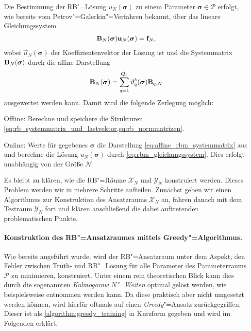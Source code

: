 \documentclass[../main.tex]{subfiles}
\begin{document}
Die Bestimmung der RB"=Lösung $u_{N}(\bm \sigma)$ zu einem Parameter $\bm \sigma \in \mathcal P$ erfolgt, wie bereits vom Petrov"=Galerkin"=Verfahren bekannt, über das lineare Gleichungssystem
\begin{equation}
\label{eq:rbm_gleichungssystem}
    \mathbf{B}_{N}(\bm \sigma) \mathbf{u}_{N}(\bm \sigma) = \mathbf{f}_{N},
\end{equation}
wobei $\vec{u}_{N}(\bm \sigma)$ der Koeffizientenvektor der Lösung ist und die Systemmatrix $\mathbf{B}_{N}(\bm \sigma)$ durch die affine Darstellung
\begin{equation}
\label{eq:affine_rbm_systemmatrix}
    \mathbf{B}_{N}(\bm \sigma) = \sum_{q = 1}^{Q_b} \vartheta_{q}^{b}(\bm \sigma) \mathbf{B}_{q, N}
\end{equation}
ausgewertet werden kann.
Damit wird die folgende Zerlegung möglich:
\begin{onoffdescription}
    \item[Offline:]
    Berechne und speichere die Strukturen \cref{eq:rb_systemmatrix_und_lastvektor,eq:rb_normmatrizen}.

    \item[Online:]
    Werte für gegebenes $\bm \sigma$ die Darstellung \cref{eq:affine_rbm_systemmatrix} aus und berechne die Lösung $u_{N}(\bm \sigma)$ durch \cref{eq:rbm_gleichungssystem}.
    Dies erfolgt unabhängig von der Größe $\mathcal N$.
\end{onoffdescription}

Es bleibt zu klären, wie die RB"=Räume $\mathcal X_{N}$ und $\mathcal Y_{N}$ konstruiert werden.
Dieses Problem werden wir in mehrere Schritte aufteilen.
Zunächst geben wir einen Algorithmus zur Konstruktion des Ansatzraums $\mathcal X_{N}$ an, fahren danach mit dem Testraum $\mathcal Y_{N}$ fort und klären anschließend die dabei auftretenden problematischen Punkte.

\paragraph{Konstruktion des RB"=Ansatzraumes mittels Greedy"=Algorithmus.} %
\label{par:konstruktion_des_reduzierte_basis_ansatzraumes_mittels_greedy_algorithmus}

Wie bereits angeführt wurde, wird der RB"=Ansatzraum unter dem Aspekt, den Fehler zwischen Truth- und RB"=Lösung für alle Parameter des Parameterraums $\mathcal P$ zu minimieren, konstruiert.
Unter einem rein theoretischen Blick kann dies durch die sogenannten \emph{Kolmogorow $N$"=Weiten} optimal gelöst werden, wie beispielsweise \cite[Section 3.4]{Patera:2007un} entnommen werden kann.
Da diese praktisch aber nicht umgesetzt werden können, wird hierfür oftmals auf einen \emph{Greedy}"=Ansatz zurückgegriffen.
Dieser ist als \cref{algorithm:greedy_training} in Kurzform gegeben und wird im Folgenden erklärt.
\end{document}
